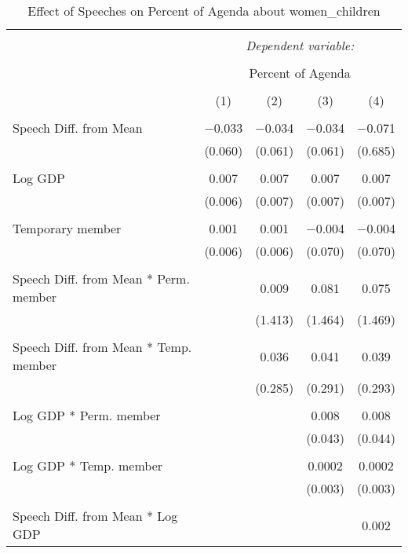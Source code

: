 
\begin{table}[!htbp] \centering 
  \caption{Effect of Speeches on Percent of Agenda about women_children} 
  \label{} 
\begin{tabular}{@{\extracolsep{5pt}}lcccc} 
\\[-1.8ex]\hline 
\hline \\[-1.8ex] 
 & \multicolumn{4}{c}{\textit{Dependent variable:}} \\ 
\cline{2-5} 
\\[-1.8ex] & \multicolumn{4}{c}{Percent of Agenda} \\ 
\\[-1.8ex] & (1) & (2) & (3) & (4)\\ 
\hline \\[-1.8ex] 
 Speech Diff. from Mean & $-$0.033 & $-$0.034 & $-$0.034 & $-$0.071 \\ 
  & (0.060) & (0.061) & (0.061) & (0.685) \\ 
  & & & & \\ 
 Log GDP & 0.007 & 0.007 & 0.007 & 0.007 \\ 
  & (0.006) & (0.007) & (0.007) & (0.007) \\ 
  & & & & \\ 
 Temporary member & 0.001 & 0.001 & $-$0.004 & $-$0.004 \\ 
  & (0.006) & (0.006) & (0.070) & (0.070) \\ 
  & & & & \\ 
 Speech Diff. from Mean * Perm. member &  & 0.009 & 0.081 & 0.075 \\ 
  &  & (1.413) & (1.464) & (1.469) \\ 
  & & & & \\ 
 Speech Diff. from Mean * Temp. member &  & 0.036 & 0.041 & 0.039 \\ 
  &  & (0.285) & (0.291) & (0.293) \\ 
  & & & & \\ 
 Log GDP * Perm. member &  &  & 0.008 & 0.008 \\ 
  &  &  & (0.043) & (0.044) \\ 
  & & & & \\ 
 Log GDP * Temp. member &  &  & 0.0002 & 0.0002 \\ 
  &  &  & (0.003) & (0.003) \\ 
  & & & & \\ 
 Speech Diff. from Mean * Log GDP &  &  &  & 0.002 \\ 

\end{tabular}
\end{table}

